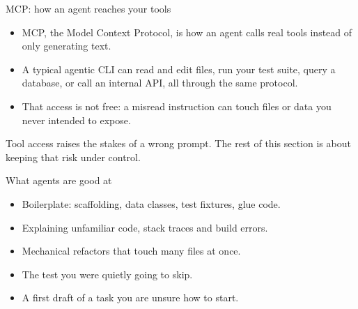 \documentclass[10pt,aspectratio=169,t]{beamer}
\begin{document}
\begin{frame}[eyebrow=Agents]{MCP: how an agent reaches your tools}
  \vskip 2mm
  \begin{itemize}
    \item MCP, the Model Context Protocol, is how an agent calls real tools instead of only generating text.
    \item A typical agentic CLI can read and edit files, run your test suite, query a database, or call an internal API, all through the same protocol.
    \item That access is not free: a misread instruction can touch files or data you never intended to expose.
  \end{itemize}
  \begin{takeaway}{Tool access raises the stakes of a wrong prompt.}
    The rest of this section is about keeping that risk under control.
  \end{takeaway}
\end{frame}

\begin{frame}[eyebrow=Agents]{What agents are good at}
  \vskip 2mm
  \begin{itemize}
    \item Boilerplate: scaffolding, data classes, test fixtures, glue code.
    \item Explaining unfamiliar code, stack traces and build errors.
    \item Mechanical refactors that touch many files at once.
    \item The test you were quietly going to skip.
    \item A first draft of a task you are unsure how to start.
  \end{itemize}
\end{frame}
\end{document}
